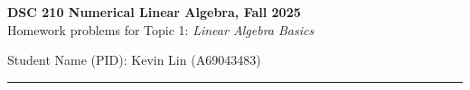\documentclass[11pt,letterpaper]{article}
\begin{document}
\pagestyle{plain}


 
\begin{center}
\textbf{\Large DSC 210 Numerical Linear Algebra, Fall 2025} \\ \bigskip
\large{Homework problems for Topic 1: \textit{Linear Algebra Basics}} \\  \bigskip
\begin{flushleft}
    \large{Student Name (PID): Kevin Lin (A69043483)}
\end{flushleft}
\end{center}
\vspace{-4mm}
\rule{\linewidth}{0.1mm}

\bigskip
\end{document}
